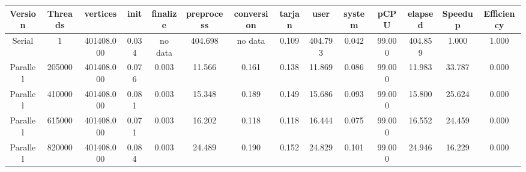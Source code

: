 \begin{tabular}{|c|c|c|c|c|c|c|c|c|c|c|c|c|c|}
\toprule
 Version &  Threads &   vertices &  init & finalize &  preprocess & conversion &  tarjan &    user &  system &   pCPU &  elapsed &  Speedup &  Efficiency \\
\midrule
  Serial &        1 & 401408.000 & 0.034 &  no data &     404.698 &    no data &   0.109 & 404.793 &   0.042 & 99.000 &  404.859 &    1.000 &       1.000 \\
Parallel &   205000 & 401408.000 & 0.076 &    0.003 &      11.566 &      0.161 &   0.138 &  11.869 &   0.086 & 99.000 &   11.983 &   33.787 &       0.000 \\
Parallel &   410000 & 401408.000 & 0.081 &    0.003 &      15.348 &      0.189 &   0.149 &  15.686 &   0.093 & 99.000 &   15.800 &   25.624 &       0.000 \\
Parallel &   615000 & 401408.000 & 0.071 &    0.003 &      16.202 &      0.118 &   0.118 &  16.444 &   0.075 & 99.000 &   16.552 &   24.459 &       0.000 \\
Parallel &   820000 & 401408.000 & 0.084 &    0.003 &      24.489 &      0.190 &   0.152 &  24.829 &   0.101 & 99.000 &   24.946 &   16.229 &       0.000 \\
\bottomrule
\end{tabular}
